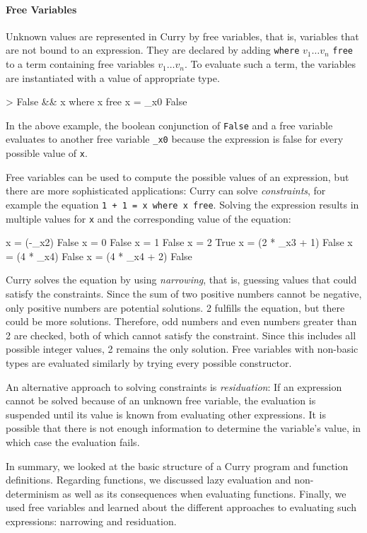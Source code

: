 \documentclass[paper = a4, fleqn, abstract=on, twoside]{scrreprt}
\begin{document}
\paragraph{Free Variables}
Unknown values are represented in Curry by free variables, that is, variables that are not bound to an expression. They are declared by adding \texttt{where} $v_1\dots v_n$ \texttt{free} to a term containing free variables $v_1 \dots v_n$. To evaluate such a term, the variables are instantiated with a value of appropriate type.
\begin{haskellcode}
> False && x where x free
{x = _x0} False
\end{haskellcode}
In the above example, the boolean conjunction of \texttt{False} and a free variable evaluates to another free variable \texttt{\_x0} because the expression is false for every possible value of \texttt{x}.
\par
Free variables can be used to compute the possible values of an expression, but there are more sophisticated applications: Curry can solve \textit{constraints}, for example the equation \texttt{1 + 1 = x where x free}. Solving the expression results in multiple values for \texttt{x} and the corresponding value of the equation:
\begin{haskellcode}
{x = (-_x2)} False
{x = 0} False
{x = 1} False
{x = 2} True
{x = (2 * _x3 + 1)} False
{x = (4 * _x4)} False
{x = (4 * _x4 + 2)} False
\end{haskellcode}
\label{narrowing}
Curry solves the equation by using \textit{narrowing}, that is, guessing values that could satisfy the constraints\citep{Hanus13}. Since the sum of two positive numbers cannot be negative, only positive numbers are potential solutions. 2 fulfills the equation, but there could be more solutions. Therefore, odd numbers and even numbers greater than 2 are checked, both of which cannot satisfy the constraint. Since this includes all possible integer values, 2 remains the only solution. Free variables with non-basic types are evaluated similarly by trying every possible constructor.
\par 
An alternative approach to solving constraints is \textit{residuation}: If an expression cannot be solved because of an unknown free variable, the evaluation is suspended until its value is known from evaluating other expressions. It is possible that there is not enough information to determine the variable's value, in which case the evaluation fails. \\
\par \noindent
In summary, we looked at the basic structure of a Curry program and function definitions. Regarding functions, we discussed lazy evaluation and non-determinism as well as its consequences when evaluating functions. Finally, we used free variables and learned about the different approaches to evaluating such expressions: narrowing and residuation.
\end{document}
